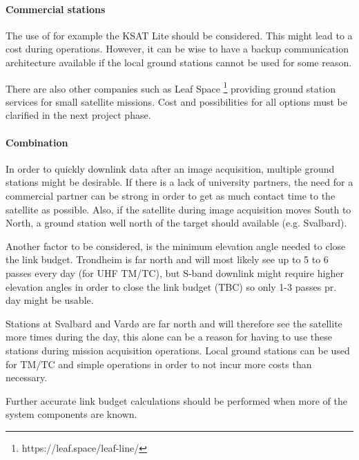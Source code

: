 \paragraph{Commercial stations}
The use of for example the KSAT Lite should be considered. This might lead to a cost during operations. However, it can be wise to have a backup communication architecture available if the local ground stations cannot be used for some reason.  


\black
There are also other companies such as Leaf Space \footnote{https://leaf.space/leaf-line/} providing ground station services for small satellite missions. 
Cost and possibilities for all options must be clarified in the next project phase. 

\paragraph{Combination}
In order to quickly downlink data after an image acquisition, multiple ground stations might be desirable. If there is a lack of university partners, the need for a commercial partner can be strong in order to get as much contact time to the satellite as possible. Also, if the satellite during image acquisition moves South to North, a ground station well north of the target should available (e.g. Svalbard). 

Another factor to be considered, is the minimum elevation angle needed to close the link budget. Trondheim is far north and will most likely see up to 5 to 6 passes every day (for UHF TM/TC), but S-band downlink might require higher elevation angles in order to close the link budget (TBC) so only 1-3 passes pr. day might be usable. 

Stations at Svalbard and Vard{\o} are far north and will therefore see the satellite more times during the day, this alone can be a reason for having to use these stations during mission acquisition operations. Local ground stations can be used for TM/TC and simple operations in order to not incur more costs than necessary. 

Further accurate link budget calculations should be performed when more of the system components are known. 

